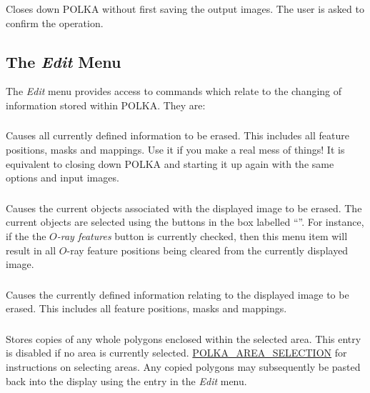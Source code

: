 \subsubsection {} Closes down POLKA without first saving the output
images. The user is asked to confirm the operation.

\subsection {The {\em Edit} Menu}
The {\em Edit} menu provides access to commands which relate to
the changing of information stored within POLKA. They are:

\subsubsection {} Causes all currently defined information to be
erased. This includes all feature positions, masks and mappings. Use it
if you make a real mess of things! It is equivalent to closing down POLKA 
and starting it up again with the same options and input images.

\subsubsection {} Causes the
current objects associated with the displayed image to be erased. The
current objects are selected using the buttons in the box labelled
``''. For instance, if the the
{\em $O$-ray features} button is currently checked, then this menu item
will result in all $O$-ray feature positions being cleared from the
currently displayed image.

\subsubsection {} Causes the
currently defined information relating to the displayed image to be
erased. This includes all feature positions, masks and mappings.

\subsubsection {} Stores copies of any
whole polygons enclosed within the selected area. This entry is disabled
if no area is currently selected. \hyperref{Go here}{See
section}{}{POLKA_AREA_SELECTION} for instructions on selecting areas. Any
copied polygons may subsequently be pasted back into the display using
the  entry in the {\em Edit} menu.

